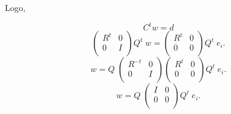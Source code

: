 \noindent Logo,

$$
C^t w = d
$$
$$
\left(
\begin{array}{cc}
R^t & 0 \\
0 & I \\
\end{array}
\right)
Q^t \; w =
\left(
\begin{array}{cc}
R^t & 0 \\
0 & 0\\
\end{array}
\right)
Q^t \; e_i.
$$
$$
w = Q \; \left(
\begin{array}{cc}
R^{-t} & 0 \\
0 & I \\
\end{array}
\right)
\left(
\begin{array}{cc}
R^t & 0 \\
0 & 0\\
\end{array}
\right)
Q^t \; e_i.
$$
$$
w = Q \; \left(
\begin{array}{cc}
I & 0 \\
0 & 0 \\
\end{array}
\right)
Q^t \; e_i.
$$


